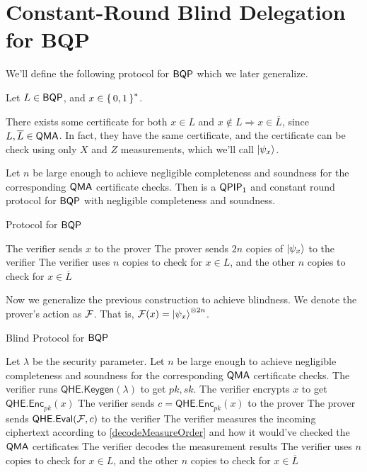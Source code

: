 \section{Constant-Round Blind Delegation for BQP}


We'll define the following protocol for $\operatorname{\mathsf{BQP}}$ which we later generalize.

Let $L\in\operatorname{\mathsf{BQP}}$, and $x\in\set{0,1}^*$.

There exists some certificate for both $x\in L$ and $x\notin L\Rightarrow x\in\overline{L}$, since $L, \overline{L}\in\operatorname{\mathsf{QMA}}$.
In fact, they have the same certificate, and the certificate can be check using only $X$ and $Z$ measurements, which we'll call $\ket{\psi_x}$. 

\begin{thm}
	Let $n$ be large enough to achieve negligible completeness and soundness for the corresponding $\operatorname{\mathsf{QMA}}$ certificate checks.
	Then  is a $\operatorname{\mathsf{QPIP}}_1$ and constant round protocol for $\operatorname{\mathsf{BQP}}$ with negligible completeness and soundness.
\end{thm}

\begin{algorithm}
	\caption{Protocol for $\operatorname{\mathsf{BQP}}$}
	\label{proto:BQP}
	\begin{algorithmic}[1]
		\State The verifier sends $x$ to the prover
		\State The prover sends $2n$ copies of $\ket{\psi_x}$ to the verifier
		\State The verifier uses $n$ copies to check for $x\in L$, and the other $n$ copies to check for $x\in\overline{L}$
	\end{algorithmic}
\end{algorithm}

Now we generalize the previous construction to achieve blindness.
We denote the prover's action as $\mathcal{F}$. That is, $\mathcal{F}(x)=\ket{\psi_x}^{\otimes 2n}$.

\begin{algorithm}
	\caption{Blind Protocol for $\operatorname{\mathsf{BQP}}$}
	\label{proto:BlindBQP}
	\begin{algorithmic}[1]
		\State Let $\lambda$ be the security parameter.
		\State Let $n$ be large enough to achieve negligible completeness and soundness for the corresponding $\operatorname{\mathsf{QMA}}$ certificate checks.
		\State The verifier runs $\mathsf{QHE.Keygen}(\lambda)$ to get $pk, sk$.
		\State The verifier encrypts $x$ to get $\mathsf{QHE.Enc}_{pk}(x)$
		\State The verifier sends $c=\mathsf{QHE.Enc}_{pk}(x)$ to the prover
		\State The prover sends $\mathsf{QHE.Eval}(\mathcal{F}, c)$ to the verifier
		\State The verifier measures the incoming ciphertext according to \autoref{decodeMeasureOrder} and how it would've checked the $\operatorname{\mathsf{QMA}}$ certificates
		\State The verifier decodes the measurement results
		\State The verifier uses $n$ copies to check for $x\in L$, and the other $n$ copies to check for $x\in\overline{L}$
	\end{algorithmic}
\end{algorithm}

